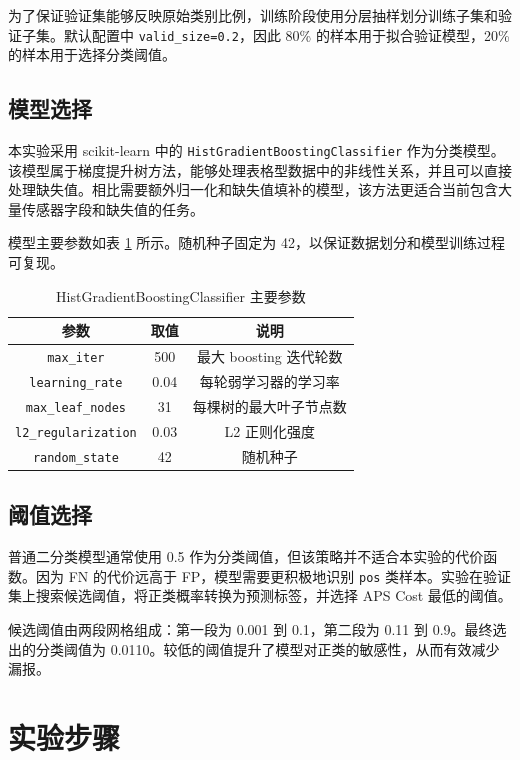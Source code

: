 \documentclass[UTF8,a4paper,10pt]{ctexart}
\begin{document}
为了保证验证集能够反映原始类别比例，训练阶段使用分层抽样划分训练子集和验证子集。默认配置中 \texttt{valid\_size=0.2}，因此 80\% 的样本用于拟合验证模型，20\% 的样本用于选择分类阈值。

\subsection{模型选择}
本实验采用 scikit-learn\cite{pedregosa2011scikit} 中的 \texttt{HistGradientBoostingClassifier} 作为分类模型。该模型属于梯度提升树方法，能够处理表格型数据中的非线性关系，并且可以直接处理缺失值。相比需要额外归一化和缺失值填补的模型，该方法更适合当前包含大量传感器字段和缺失值的任务。

模型主要参数如表 \ref{tab:model-params} 所示。随机种子固定为 42，以保证数据划分和模型训练过程可复现。

\begin{table}[H]
  \centering
  \begin{tabular}{ccc}
  \toprule
  参数 & 取值 & 说明\\
  \midrule
  \texttt{max\_iter} & 500 & 最大 boosting 迭代轮数\\
  \texttt{learning\_rate} & 0.04 & 每轮弱学习器的学习率\\
  \texttt{max\_leaf\_nodes} & 31 & 每棵树的最大叶子节点数\\
  \texttt{l2\_regularization} & 0.03 & L2 正则化强度\\
  \texttt{random\_state} & 42 & 随机种子\\
  \bottomrule
  \end{tabular}
  \caption{HistGradientBoostingClassifier 主要参数}
  \label{tab:model-params}
\end{table}

\subsection{阈值选择}
普通二分类模型通常使用 0.5 作为分类阈值，但该策略并不适合本实验的代价函数。因为 FN 的代价远高于 FP，模型需要更积极地识别 \texttt{pos} 类样本。实验在验证集上搜索候选阈值，将正类概率转换为预测标签，并选择 APS Cost 最低的阈值。

候选阈值由两段网格组成：第一段为 0.001 到 0.1，第二段为 0.11 到 0.9。最终选出的分类阈值为 0.0110。较低的阈值提升了模型对正类的敏感性，从而有效减少漏报。

\section{实验步骤}
\end{document}
